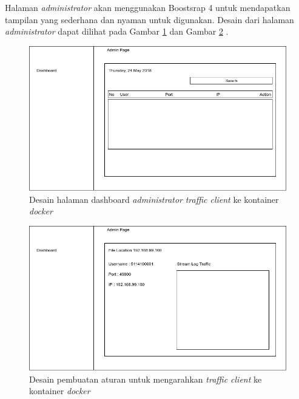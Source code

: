 	Halaman \textit{administrator} akan menggunakan Boostsrap 4 untuk mendapatkan tampilan yang sederhana dan nyaman untuk digunakan. Desain dari halaman \textit{administrator} dapat dilihat pada Gambar \ref{desaindashboard} dan Gambar \ref{desainstream} .
	
	\begin{figure}[H]
		\centering
		\includegraphics[width=\linewidth]{images/bab3/desaindashboard}
		\caption{Desain halaman dashboard \textit{administrator} \textit{traffic client} ke kontainer \textit{docker}}
		\label{desaindashboard}
	\end{figure}
	
	\begin{figure}[H]
		\centering
		\includegraphics[width=\linewidth]{images/bab3/desainstream}
		\caption{Desain pembuatan aturan untuk mengarahkan \textit{traffic client} ke kontainer \textit{docker}}
		\label{desainstream}
	\end{figure}
	

	